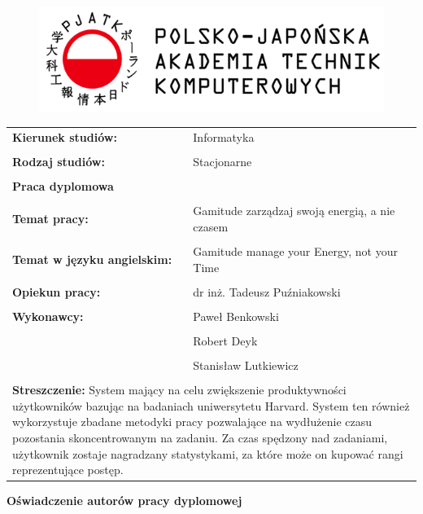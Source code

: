 \documentclass[a4paper,11pt]{report}
\begin{document}
\let\cleardoublepage\clearpage
\begin{figure}[ht]
\centering
\includegraphics{pjatk}
\end{figure}
\vspace{1cm}
\begin{tabular}{ p{7cm} p{7cm} }
\textbf{Kierunek studiów:} & Informatyka \\
 & \\
\textbf{Rodzaj studiów:} & Stacjonarne \\
 & \\
\multicolumn{2}{p{13cm}}{\centering\textbf{\huge Praca dyplomowa}}\\
 & \\
\textbf{Temat pracy:} & Gamitude zarządzaj swoją energią, a nie czasem \\
 & \\
\textbf{Temat w języku angielskim:} & Gamitude manage your Energy, not your Time \\
 & \\
\textbf{Opiekun pracy:} & dr inż. Tadeusz Puźniakowski \\
 & \\
\textbf{Wykonawcy:} & Paweł Benkowski \\
 & \\
 & Robert Deyk \\
 & \\
 & Stanisław Lutkiewicz \\
 & \\
\multicolumn{2}{p{13cm}}{\textbf{Streszczenie:} System mający na celu zwiększenie produktywności użytkowników bazując na badaniach uniwersytetu Harvard.
 System ten również wykorzystuje zbadane metodyki pracy pozwalające na wydłużenie czasu pozostania skoncentrowanym na zadaniu. Za czas spędzony nad zadaniami,
  użytkownik zostaje nagradzany statystykami, za które może on kupować rangi reprezentujące postęp.}\\
\end{tabular}
\newpage
\begin{center}
	\textbf{Oświadczenie autorów pracy dyplomowej}\\
\end{center}
\end{document}
